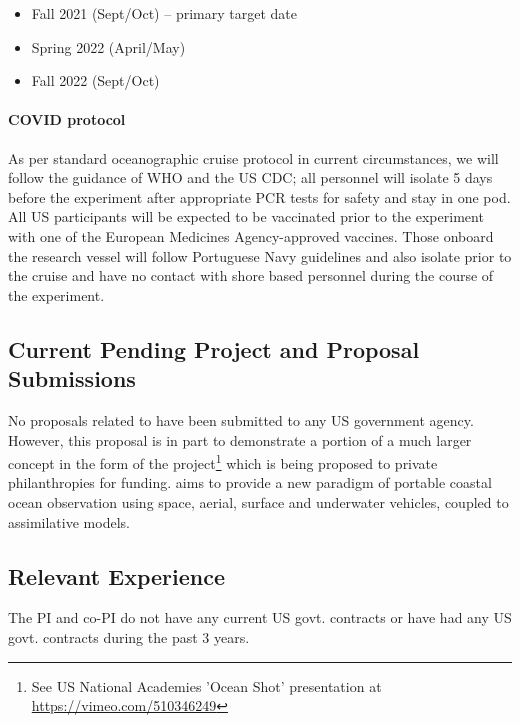 \begin{itemize}[noitemsep,topsep=0pt,parsep=0pt,partopsep=0pt]
\vspace{+0.25cm}
\item Fall 2021 (Sept/Oct) -- primary target date
\item Spring 2022 (April/May)
\item Fall 2022 (Sept/Oct) 

\end{itemize}  

\paragraph{COVID protocol} As per standard oceanographic cruise
protocol in current circumstances, we will follow the guidance of WHO
and the US CDC; all personnel will isolate 5 days before the
experiment after appropriate PCR tests for safety and stay in one
pod. All US participants will be expected to be vaccinated prior to
the experiment with one of the European Medicines Agency-approved
vaccines. Those onboard the \inst research vessel will follow
Portuguese Navy guidelines and also isolate prior to the cruise and
have no contact with shore based personnel during the course of the
experiment.


\subsection{Current Pending Project and Proposal Submissions}

No proposals related to \proj have been submitted to any US government
agency. However, this proposal is in part to demonstrate a portion of
a much larger concept in the form of the \met project\footnote{See US
  National Academies 'Ocean Shot' presentation at
  \url{https://vimeo.com/510346249}} which is being proposed to
private philanthropies for funding. \met aims to provide a new
paradigm of portable coastal ocean observation using space, aerial,
surface and underwater vehicles, coupled to assimilative models.

\subsection{Relevant Experience}


The PI and co-PI do not have any current US govt. contracts or have
had any US govt. contracts during the past 3 years.


